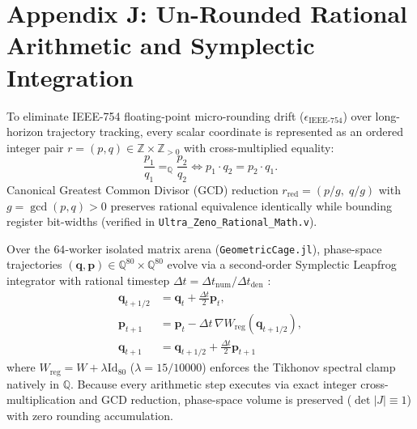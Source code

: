 \section*{Appendix J: Un-Rounded Rational Arithmetic and Symplectic Integration}
\label{app:rational}

\begin{definition}
To eliminate IEEE-754 floating-point micro-rounding drift ($\epsilon_{\mathrm{IEEE\text{-}754}}$) over long-horizon trajectory tracking, every scalar coordinate is represented as an ordered integer pair $r = (p, q) \in \mathbb{Z} \times \mathbb{Z}_{>0}$ with cross-multiplied equality:
\begin{equation}
  \frac{p_1}{q_1} =_{\mathbb{Q}} \frac{p_2}{q_2} \iff p_1 \cdot q_2 = p_2 \cdot q_1.
\end{equation}
Canonical Greatest Common Divisor (GCD) reduction $r_{\mathrm{red}} = (p / g,\; q / g)$ with $g = \gcd(p, q) > 0$ preserves rational equivalence identically while bounding register bit-widths (verified in \texttt{Ultra\_Zeno\_Rational\_Math.v}).
\end{definition}

\begin{proposition}
Over the $64$-worker isolated matrix arena (\texttt{GeometricCage.jl}), phase-space trajectories $(\mathbf{q}, \mathbf{p}) \in \mathbb{Q}^{80} \times \mathbb{Q}^{80}$ evolve via a second-order Symplectic Leapfrog integrator with rational timestep $\Delta t = \Delta t_{\mathrm{num}} / \Delta t_{\mathrm{den}}$ \cite{earn2001exact}:
\begin{align}
  \mathbf{q}_{t + 1/2} &= \mathbf{q}_t + \frac{\Delta t}{2} \mathbf{p}_t, \\
  \mathbf{p}_{t + 1}   &= \mathbf{p}_t - \Delta t \, \nabla W_{\mathrm{reg}}(\mathbf{q}_{t + 1/2}), \\
  \mathbf{q}_{t + 1}   &= \mathbf{q}_{t + 1/2} + \frac{\Delta t}{2} \mathbf{p}_{t + 1}
\end{align}
where $W_{\mathrm{reg}} = W + \lambda \mathrm{Id}_{80}$ ($\lambda = 15 / 10000$) enforces the Tikhonov spectral clamp natively in $\mathbb{Q}$. Because every arithmetic step executes via exact integer cross-multiplication and GCD reduction, phase-space volume is preserved ($\det |J| \equiv 1$) with zero rounding accumulation.
\end{proposition}
